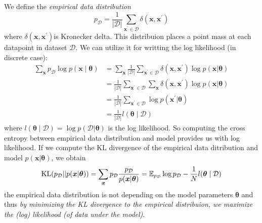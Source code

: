 We define the \textit{empirical data distribution}
$$
p_{\mathcal{D}} = \frac{1}{|\mathcal{D}|} \sum_{\boldsymbol{x}^\prime \in \mathcal{D}} \delta(\boldsymbol{x},\boldsymbol{x}^\prime)
$$
where $\delta(\boldsymbol{x},\boldsymbol{x}^\prime)$is Kronecker delta.  This distribuion places a point mass at each datapoint in dataset $\mathcal{D}$.
We can utilize it for writting the log likelihood (in discrete case):
\begin{align*}
\sum_{\boldsymbol{x}} p_{\mathcal{D}} \log p(\boldsymbol{x} \mid \boldsymbol{\theta}) &= \sum_{\boldsymbol{x}} \frac{1}{|\mathcal{D}|} \sum_{\boldsymbol{x}^\prime \in \mathcal{D}} \delta(\boldsymbol{x},\boldsymbol{x}^\prime) \log  p(\boldsymbol{x} | \boldsymbol{\theta}) \\
    &= \frac{1}{|\mathcal{D}|} \sum_{\boldsymbol{x}^\prime \in \mathcal{D}} \sum_{\boldsymbol{x}} \delta(\boldsymbol{x},\boldsymbol{x}^\prime) \log  p(\boldsymbol{x} | \boldsymbol{\theta})\\
    &= \frac{1}{|\mathcal{D}|} \sum_{\boldsymbol{x}^\prime \in \mathcal{D}} \log  p(\boldsymbol{x}^\prime | \boldsymbol{\theta}) \\
    &= \frac{1}{|\mathcal{D}|} l(\boldsymbol{\theta} \mid \mathcal{D})
\end{align*}
where $l(\boldsymbol{\theta} \mid \mathcal{D}) = \log p(\mathcal{D} | \boldsymbol{\theta})$ is the log likelihood. So computing the cross entropy between empirical data distribution and model provides us with log likelihood.
If we compute the KL divergence of the empirical data ditribution and model $p(\boldsymbol{x} | \boldsymbol{\theta})$, we obtain
$$
\mathrm{KL}(p_{\mathcal{D}} || p(\boldsymbol{x} | \boldsymbol{\theta})) = \sum_{\boldsymbol{x}} p_{\mathcal{D}} \frac{p_{\mathcal{D}}}{p(\boldsymbol{x} | \boldsymbol{\theta})} = \operatorname{\mathbb{E}}_{p_{\mathcal{D}}} \log p_{\mathcal{D}} - \frac{1}{N} l(\boldsymbol{\theta} \mid \mathcal{D})
$$ 
the empirical data distribution is not depending on the model parameters $\boldsymbol{\theta}$ and thus \textit{by minimizing the KL divergence to the empirical distribuion, we maximize the (log) likelihood (of data under the model)}. 
